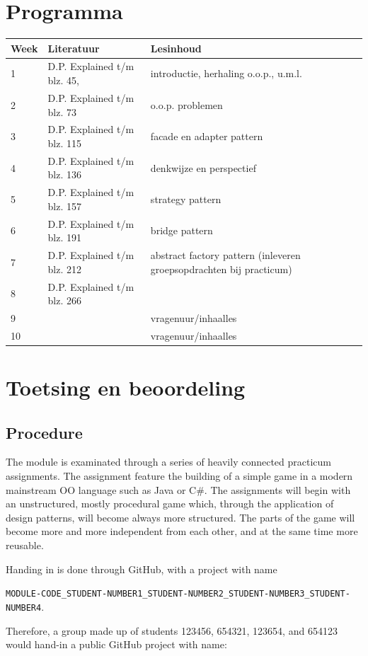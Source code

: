 \documentclass[titlepage,a4paper, 11pt]{article}
\begin{document}
\section{Programma}

\begin{tabular}{|p{1cm}|p{4cm}|p{4cm}|}
\hline
Week&Literatuur&Lesinhoud\\
\hline
1&D.P. Explained t/m blz. 45,&introductie, herhaling o.o.p., u.m.l.\\
\hline
2&D.P. Explained t/m blz. 73&o.o.p. problemen\\
\hline
3&D.P. Explained t/m blz. 115&facade en adapter pattern\\
\hline
4&D.P. Explained t/m blz. 136&denkwijze en perspectief\\
\hline
5&D.P. Explained t/m blz. 157&strategy pattern\\
\hline
6&D.P. Explained t/m blz. 191&bridge pattern\\
\hline
7&D.P. Explained t/m blz. 212&abstract factory pattern (inleveren groepsopdrachten bij practicum)\\
\hline
8&D.P. Explained t/m blz. 266 &\\
\hline
9&&vragenuur/inhaalles\\
\hline
10&&vragenuur/inhaalles\\
\hline
\end{tabular}
\section{Toetsing en beoordeling}
\subsection{Procedure}
The module is examinated through a series of heavily connected practicum assignments. The assignment feature the building of a simple game in a modern mainstream OO language such as Java or C\#. The assignments will begin with an unstructured, mostly procedural game which, through the application of design patterns, will become always more structured. The parts of the game will become more and more independent from each other, and at the same time more reusable.

Handing in is done through GitHub, with a project with name 

\texttt{MODULE-CODE\_STUDENT-NUMBER1\_STUDENT-NUMBER2\_STUDENT-NUMBER3\_STUDENT-NUMBER4}. 

Therefore, a group made up of students 123456, 654321, 123654, and 654123 would hand-in a public GitHub project with name:
\end{document}
